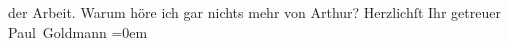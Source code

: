 \begin{ledgroupsized}[t]{13cm}
               der Arbeit. Warum höre ich gar nichts mehr von Arthur?\pend
           \pstart
           Herzlichſt Ihr getreuer {\\[\baselineskip]}\spacefill\mbox{Paul Goldmann}\pend
           \leftskip=0em{}
         
         \endnumbering{}\end{ledgroupsized}\begin{anhang}\end{anhang}\newcommand{\dateiname}{L03529}\newcommand{\titel}{Paul Goldmann an Olga Gussmann, 21. 1. 1903}\newcommand{\editorInnen}{Martin Anton Müller und Laura Untner}
      